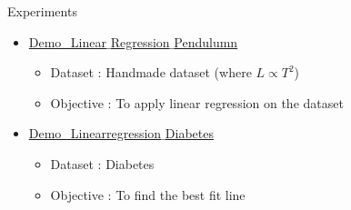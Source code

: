\documentclass[aspectratio=169,14pt]{beamer}
\begin{document}


\begin{frame}{Experiments}
\begin{itemize}
\item \href{https://drive.google.com/file/d/1lVRix6wwRteMKwwNGCofH-kFLkXDlPby/view?usp=sharing}{Demo\_Linear$\_$Regression$\_$Pendulumn}
\begin{itemize}
\item Dataset : Handmade dataset (where $L\propto T^2$)
\item Objective : To apply linear regression on the dataset
\end{itemize}
\item \href{https://drive.google.com/file/d/1JN_kUD4I1rX6ibho493PYo74jvuC-xs_/view?usp=sharing}{Demo\_Linearregression$\_$Diabetes}
\begin{itemize}
 \item Dataset : Diabetes
\item  Objective : To find the best fit line
\end{itemize}
\end{itemize}
\end{frame}



{\1
\begin{frame}
\end{frame}
}
\end{document}
